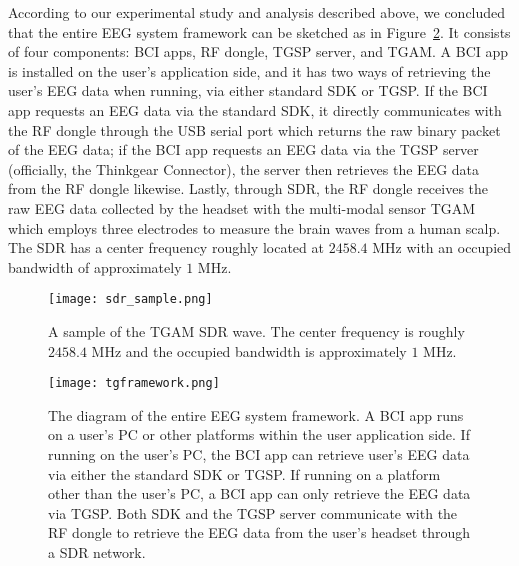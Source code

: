%
\indent According to our experimental study and analysis described above, we concluded that the entire EEG system framework can be sketched as in Figure~\ref{fig:tgframework}. It consists of four components: BCI apps, RF dongle, TGSP server, and TGAM. A BCI app is installed on the user's application side, and it has two ways of retrieving the user's EEG data when running, via either standard SDK or TGSP. If the BCI app requests an EEG data via the standard SDK, it directly communicates with the RF dongle through the USB serial port which returns the raw binary packet of the EEG data; if the BCI app requests an EEG data via the TGSP server (officially, the Thinkgear Connector), the server then retrieves the EEG data from the RF dongle likewise. Lastly, through SDR, the RF dongle receives the raw EEG data collected by the headset with the multi-modal sensor TGAM which employs three electrodes to measure the brain waves from a human scalp. The SDR has a center frequency roughly located at $2458.4$ MHz with an occupied bandwidth of approximately $1$ MHz.

\begin{figure}[!htb]
        \centering
        \texttt{[image: sdr\_sample.png]}
        \caption{A sample of the TGAM SDR wave. The center frequency is roughly $2458.4$ MHz and the occupied bandwidth is approximately $1$ MHz.}
        \label{fig:sdrsample}
\end{figure}

\begin{figure}[!htb]
        \centering
        \texttt{[image: tgframework.png]}
        \caption{The diagram of the entire EEG system framework. A BCI app runs on a user's PC or other platforms within the user application side. If running on the user's PC, the BCI app can retrieve user's EEG data via either the standard SDK or TGSP. If running on a platform other than the user's PC, a BCI app can only retrieve the EEG data via TGSP. Both SDK and the TGSP server communicate with the RF dongle to retrieve the EEG data from the user's headset through a SDR network.}
        \label{fig:tgframework}
\end{figure}
